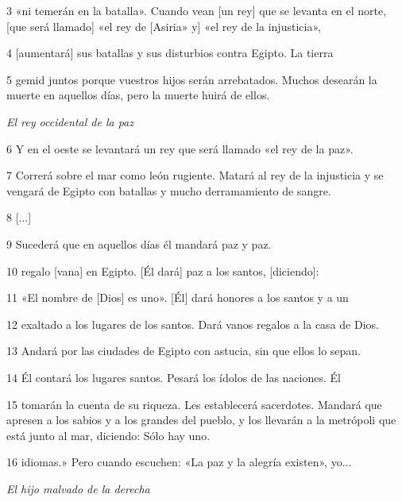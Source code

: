 \par 3 «ni temerán en la batalla». Cuando vean [un rey] que se levanta en el norte, [que será llamado] «el rey de [Asiria» y] «el rey de la injusticia»,

\par 4 [aumentará] sus batallas y sus disturbios contra Egipto. La tierra

\par 5 gemid juntos porque vuestros hijos serán arrebatados. Muchos desearán la muerte en aquellos días, pero la muerte huirá de ellos.

\par \textit{El rey occidental de la paz}

\par 6 Y en el oeste se levantará un rey que será llamado «el rey de la paz».

\par 7 Correrá sobre el mar como león rugiente. Matará al rey de la injusticia y se vengará de Egipto con batallas y mucho derramamiento de sangre.

\par 8 [...]

\par 9 Sucederá que en aquellos días él mandará paz y paz.

\par 10 regalo [vana] en Egipto. [Él dará] paz a los santos, [diciendo]:

\par 11 «El nombre de [Dios] es uno». [Él] dará honores a los santos y a un

\par 12 exaltado a los lugares de los santos. Dará vanos regalos a la casa de Dios.

\par 13 Andará por las ciudades de Egipto con astucia, sin que ellos lo sepan.

\par 14 Él contará los lugares santos. Pesará los ídolos de las naciones. Él

\par 15 tomarán la cuenta de su riqueza. Les establecerá sacerdotes. Mandará que apresen a los sabios y a los grandes del pueblo, y los llevarán a la metrópoli que está junto al mar, diciendo: Sólo hay uno.

\par 16 idiomas.» Pero cuando escuchen: «La paz y la alegría existen», yo...

\par \textit{El hijo malvado de la derecha}

